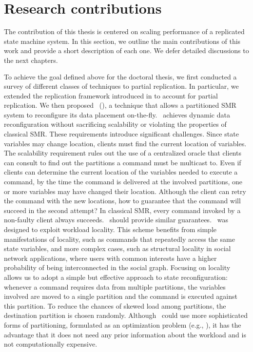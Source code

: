\section{Research contributions}
\label{sec:contribution}


The contribution of this thesis is centered on scaling performance of a
replicated state machine system. In this section, we outline the main
contributions of this work and provide a short description of each one. We defer
detailed discussions to the next chapters.


To achieve the goal defined above for the doctoral thesis, we first conducted a
survey of different classes of techniques to partial replication. In particular, we extended the replication
framework introduced in \cite{pedone:replication} to account for partial replication.
We then proposed \textbf{\dssmrlong}\ (\dssmr), a technique that allows a
partitioned SMR system to reconfigure its data placement on-the-fly. \dssmr\
achieves dynamic data reconfiguration without sacrificing scalability or
violating the properties of classical SMR. These requirements introduce
significant challenges. Since state variables may change location, clients must
find the current location of variables. The scalability requirement rules out
the use of a centralized oracle that clients can consult to find out the
partitions a command must be multicast to. Even if clients can determine the
current location of the variables needed to execute a command, by the time the
command is delivered at the involved partitions, one or more variables may have
changed their location. Although the client can retry the command with the new
locations, how to guarantee that the command will succeed in the second attempt?
In classical SMR, every command invoked by a non-faulty client always succeeds.
\dssmr\ should provide similar guarantees. \dssmr\ was designed to exploit
workload locality. This scheme benefits from simple manifestations of locality,
such as commands that repeatedly access the same state variables, and more
complex cases, such as structural locality in social network applications, where
users with common interests have a higher probability of being interconnected in
the social graph. Focusing on locality allows us to adopt a simple but effective
approach to state reconfiguration: whenever a command requires data from
multiple partitions, the variables involved are moved to a single partition and
the command is executed against this partition. To reduce the chances of skewed
load among partitions, the destination partition is chosen randomly. Although
\dssmr\ could use more sophisticated forms of partitioning, formulated as an
optimization problem (e.g., \cite{curino2010sch,taft2014est}), it has
the advantage that it does not need any prior information about the workload and
is not computationally expensive.

